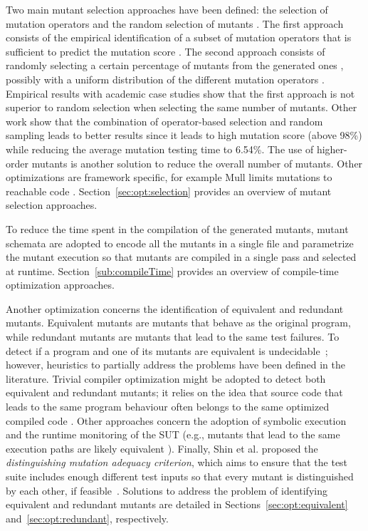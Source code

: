 Two main mutant selection approaches have been defined: the selection of mutation operators and the random selection of mutants \cite{zhang2010operator}. The first approach consists of the empirical identification of a subset of mutation operators that is sufficient to predict the mutation score \cite{siami2008sufficient,barbosa2001toward}. The second approach consists of randomly selecting a certain percentage of mutants from the generated ones \cite{wong1995reducing}, possibly with a uniform distribution of the different mutation operators \cite{zhang2010operator}. Empirical results with academic case studies \cite{zhang2010operator} show that the first approach is not superior to random selection when selecting the same number of mutants. Other work \cite{zhang2013operator} show that the combination of operator-based selection and random sampling leads to better results since it leads to high mutation score (above 98\%) while reducing the average mutation testing time to 6.54\%. The use of higher-order mutants is another solution to reduce the overall number of mutants. Other optimizations are framework specific, for example Mull limits mutations to reachable code \cite{hariri2018srciror}. Section~\ref{sec:opt:selection} provides an overview of mutant selection approaches.

To reduce the time spent in the compilation of the generated mutants, mutant schemata \cite{untch1993mutation} are adopted to encode all the mutants in a single file and parametrize the mutant execution so that mutants are compiled in a single pass and selected at runtime. Section~\ref{sub:compileTime} provides an overview of compile-time optimization approaches.


Another optimization concerns the identification of equivalent and redundant mutants. Equivalent mutants are mutants that behave as the original program, while redundant mutants are mutants that lead to the same test failures. 
To detect if a program and one of its mutants are
equivalent is undecidable~\cite{Budd:1982}; however, heuristics to partially address the problems have been defined in the literature.
Trivial compiler optimization might be adopted to detect both equivalent and redundant mutants; it relies on the idea that source code that leads to the same program behaviour often belongs to the same optimized compiled code \cite{papadakis2015trivial}. Other approaches concern the adoption of symbolic execution \cite{papadakis2012mutation,kurtz2015static} and the runtime monitoring of the SUT (e.g., mutants that lead to the same execution paths are likely equivalent \cite{schuler2013covering}). Finally, Shin et al. proposed the \emph{distinguishing mutation adequacy criterion}, which aims to ensure that the test suite includes enough different test inputs so that every mutant is distinguished by each other, if feasible~\cite{shin2017theoretical}. 
Solutions to address the problem of identifying equivalent and redundant mutants are detailed in Sections~\ref{sec:opt:equivalent} and~\ref{sec:opt:redundant}, respectively.



